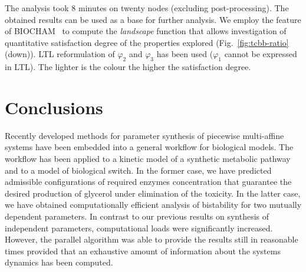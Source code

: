 \documentclass{llncs}
\begin{document}


The analysis took 8 minutes on twenty nodes (excluding post-processing). 
The obtained results can be used as a base for further analysis. We employ the feature of BIOCHAM~\cite{calzone2006biocham} to compute the {\em landscape} function that allows investigation of quantitative satisfaction degree of the properties explored (Fig.~\ref{fig:tcbb-ratio} (down)). %
LTL reformulation of $\varphi_2$ and $\varphi_3$ has been used ($\varphi_1$ cannot be expressed in LTL). The lighter is the colour the higher the satisfaction degree. 


\enlargethispage*{7mm}
\section{Conclusions}
\label{sec:conclusion}

Recently developed methods for parameter synthesis of piecewise multi-affine systems have been embedded into a general workflow for biological models. The workflow has been applied to a kinetic model of a synthetic metabolic pathway and to a model of biological switch. In the former case, we have predicted admissible configurations of required enzymes concentration that guarantee the desired production of glycerol under elimination of the toxicity. In the latter case, we have obtained computationally efficient analysis of bistability for two mutually dependent parameters. In contrast to our previous results on synthesis of independent parameters, computational loads were significantly increased. However, the parallel algorithm was able to provide the results still in reasonable times provided that an exhaustive amount of information about the systems dynamics has been computed.    
\end{document}
